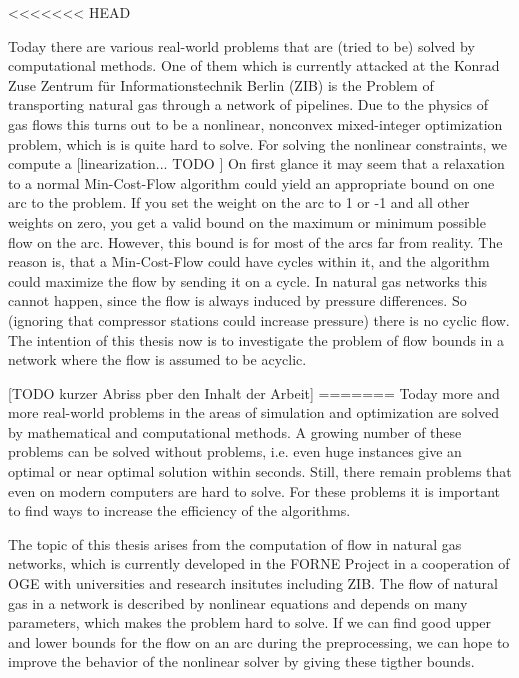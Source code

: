 
<<<<<<< HEAD

Today there are various real-world problems that are (tried to be) solved by computational methods. One of them which 
is currently attacked at the Konrad Zuse Zentrum für Informationstechnik Berlin (ZIB) is the Problem of transporting 
natural gas through a network of pipelines. Due to the physics of gas flows this turns out to be a nonlinear, nonconvex 
mixed-integer optimization problem, which is is quite hard to solve. 
For solving the nonlinear constraints, we compute a [linearization... TODO ]
On first glance it may seem that a relaxation to a normal Min-Cost-Flow algorithm could yield an appropriate bound 
on one arc to the problem. If you set the weight on the arc to 1 or -1 and all other weights on zero, you get a 
valid bound on the maximum or minimum possible flow on the arc. However, this bound is for most of the arcs far from 
reality. The reason is, that a Min-Cost-Flow could have cycles within it, and the algorithm could maximize the flow by 
sending it on a cycle. In natural gas networks this cannot happen, since the flow is always induced by pressure 
differences. So (ignoring that compressor stations could increase pressure) there is no cyclic flow. 
The intention of this thesis now is to investigate the problem of flow bounds in a network where the flow is assumed 
to be acyclic. 

[TODO kurzer Abriss pber den Inhalt der Arbeit]
=======
Today more and more real-world problems in the areas of simulation and optimization are solved by mathematical and 
computational methods. A growing number of these problems can be solved without problems, i.e. even huge instances give 
an optimal or near optimal solution within seconds. Still, there remain problems that even on modern computers are hard 
to solve. For these problems it is important to find ways to increase the efficiency of the algorithms. 

The topic of this thesis arises from the computation of flow in natural gas networks, which is currently developed 
in the FORNE Project in a cooperation of OGE with universities and research insitutes including ZIB.
The flow of natural gas in a network is described by nonlinear equations and depends on many parameters, which makes 
the problem hard to solve. If we can find good upper and lower bounds for the flow on an arc during the preprocessing, 
we can hope to improve the behavior of the nonlinear solver by giving these tigther bounds. 

